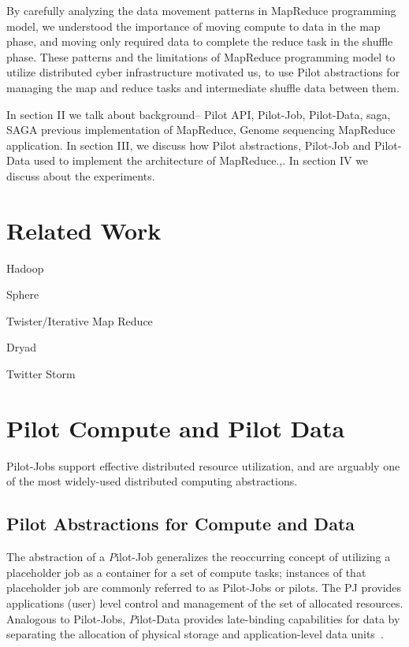 \documentclass{acm_proc_article-sp}
\newcommand{\pilotjobs}{Pilot-Jobs\xspace}
\begin{document}
By carefully analyzing the data movement patterns in MapReduce programming
model, we understood the importance of moving compute to data in the map
phase, and moving only required data to complete the reduce task in the
shuffle phase. These patterns and the limitations of MapReduce programming
model to utilize distributed cyber infrastructure motivated us, to use Pilot
abstractions for managing the map and reduce tasks and intermediate shuffle
data between them.


In section II we talk about background-- Pilot API, Pilot-Job, Pilot-Data,
saga, SAGA previous implementation of MapReduce, Genome sequencing MapReduce
application. In section III, we discuss how Pilot abstractions, Pilot-Job and
Pilot-Data used to implement the architecture of MapReduce.,. In section IV we
discuss about the experiments.

\section{Related Work}

Hadoop

Sphere

Twister/Iterative Map Reduce~\cite{Ekanayake:2010:TRI:1851476.1851593}

Dryad

Twitter Storm

\section{Pilot Compute and Pilot Data}

Pilot-Jobs support effective distributed resource utilization, and are arguably one of the most widely-used distributed computing abstractions. 

\subsection{Pilot Abstractions for Compute and Data}

The abstraction of a {\emph Pilot-Job} generalizes the reoccurring concept of
utilizing a placeholder job as a container for a set of compute tasks;
instances of that placeholder job are commonly referred to as Pilot-Jobs or
pilots. The PJ provides applications (user) level control and management of
the set of allocated resources. Analogous to \pilotjobs, {\emph Pilot-Data}
provides late-binding capabilities for data by separating the allocation of
physical storage and application-level data units~\cite{pstar-2012}.
\end{document}
